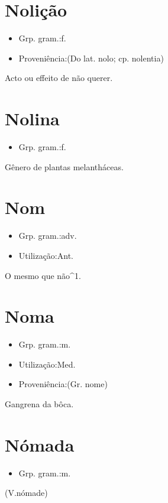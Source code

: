 \section{Nolição}
\begin{itemize}
\item {Grp. gram.:f.}
\end{itemize}
\begin{itemize}
\item {Proveniência:(Do lat. \textunderscore nolo\textunderscore ; cp. \textunderscore nolentia\textunderscore )}
\end{itemize}
Acto ou effeito de não querer.
\section{Nolina}
\begin{itemize}
\item {Grp. gram.:f.}
\end{itemize}
Gênero de plantas melantháceas.
\section{Nom}
\begin{itemize}
\item {Grp. gram.:adv.}
\end{itemize}
\begin{itemize}
\item {Utilização:Ant.}
\end{itemize}
O mesmo que \textunderscore não\textunderscore ^1.
\section{Noma}
\begin{itemize}
\item {Grp. gram.:m.}
\end{itemize}
\begin{itemize}
\item {Utilização:Med.}
\end{itemize}
\begin{itemize}
\item {Proveniência:(Gr. \textunderscore nome\textunderscore )}
\end{itemize}
Gangrena da bôca.
\section{Nómada}
\begin{itemize}
\item {Grp. gram.:m.}
\end{itemize}
(V.nómade)
